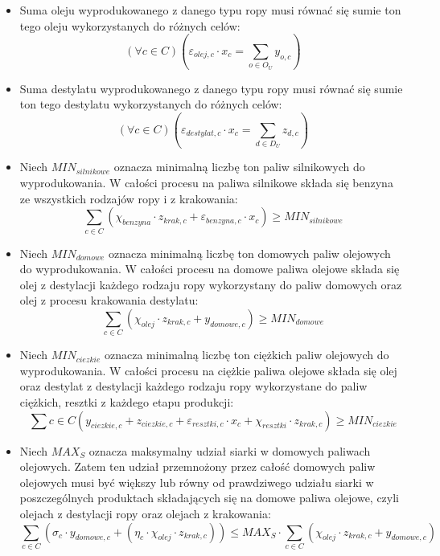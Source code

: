 \documentclass{article}
\begin{document}
\begin{itemize}
    \item Suma oleju wyprodukowanego z danego typu ropy musi równać się sumie ton tego oleju wykorzystanych do różnych celów:
    $$\left(\forall c \in C\right) \left(\varepsilon_{olej, c} \cdot  x_c = \sum_{o \in O_U} y_{o, c}\right)$$
    
    \item Suma destylatu wyprodukowanego z danego typu ropy musi równać się sumie ton tego destylatu wykorzystanych do różnych celów:
    $$\left(\forall c \in C\right) \left( \varepsilon_{destylat, c} \cdot  x_{c} = \sum_{d \in D_U} z_{d, c}\right)$$
    
    \item Niech $MIN_{silnikowe}$ oznacza minimalną liczbę ton paliw silnikowych do wyprodukowania. W całości procesu na paliwa silnikowe składa się benzyna ze wszystkich rodzajów ropy i z krakowania:
    $$\sum_{c \in C} \left(\chi_{benzyna} \cdot  z_{krak, c} + \varepsilon_{benzyna, c} \cdot  x_{c}\right) \geq MIN_{silnikowe}$$

    \item Niech $MIN_{domowe}$ oznacza minimalną liczbę ton domowych paliw olejowych do wyprodukowania. W całości procesu na domowe paliwa olejowe składa się olej z destylacji każdego rodzaju ropy wykorzystany do paliw domowych oraz olej z procesu krakowania destylatu:
    $$\sum_{c \in C} (\chi_{olej} \cdot  z_{krak, c} + y_{domowe, c}) \geq MIN_{domowe}$$

    \item Niech $MIN_{ciezkie}$ oznacza minimalną liczbę ton ciężkich paliw olejowych do wyprodukowania. W całości procesu na ciężkie paliwa olejowe składa się olej oraz destylat z destylacji każdego rodzaju ropy wykorzystane do paliw ciężkich, resztki z każdego etapu produkcji:
    $$\sum {c \in C} (y_{ciezkie, c} + z_{ciezkie, c} + \varepsilon_{resztki, c} \cdot  x_{c} + \chi_{resztki} \cdot  z_{krak, c})  \geq MIN_{ciezkie}$$

    \item Niech $MAX_S$ oznacza maksymalny udział siarki w domowych paliwach olejowych. Zatem ten udział przemnożony przez całość domowych paliw olejowych musi być większy lub równy od prawdziwego udziału siarki w poszczególnych produktach składających się na domowe paliwa olejowe, czyli olejach z destylacji ropy oraz olejach z krakowania:
    $$\sum_{c \in C} (\sigma_{c} \cdot  y_{domowe, c} + (\eta_{c} \cdot  \chi_{olej} \cdot  z_{krak, c})) \leq MAX_S \cdot  \sum_{c \in C} (\chi_{olej} \cdot  z_{krak, c} + y_{domowe, c})$$
\end{itemize}
\end{document}
